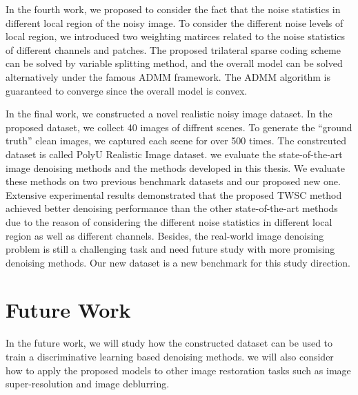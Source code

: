 In the fourth work, we proposed to consider the fact that the noise statistics in different local region of the noisy image. To consider the different noise levels of local region, we introduced two weighting matirces related to the noise statistics of different channels and patches. The proposed trilateral sparse coding scheme can be solved by variable splitting method, and the overall model can be solved alternatively under the famous ADMM framework. The ADMM algorithm is guaranteed to converge since the overall model is convex.

In the final work, we constructed a novel realistic noisy image dataset. In the proposed dataset, we collect 40 images of diffrent scenes. To generate the ``ground truth'' clean images, we captured each scene for over 500 times. The constrcuted dataset is called PolyU Realistic Image dataset. we evaluate the state-of-the-art image denoising methods and the methods developed in this thesis. We evaluate these methods on two previous benchmark datasets and our proposed new one. Extensive experimental results demonstrated that the proposed TWSC method achieved better denoising performance than the other state-of-the-art methods due to the reason of considering the different noise statistics in different local region as well as different channels. Besides, the real-world image denoising problem is still a challenging task and need future study with more promising denoising methods. Our new dataset is a new benchmark for this study direction.



\section{Future Work}
\label{sec:conclusions:future}

In the future work, we will study how the constructed dataset can be used to train a discriminative learning based denoising methods. we will also consider how to apply the proposed models to other image restoration tasks such as image super-resolution and image deblurring.
